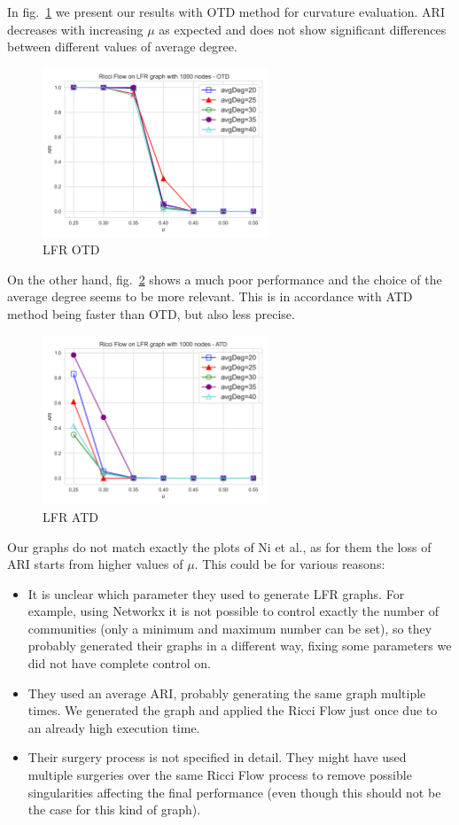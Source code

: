 In fig.~\ref{fig:LFR_OTD} we present our results with OTD method for curvature evaluation. ARI decreases with increasing $\mu$ as expected and does not show significant differences between different values of average degree.
\begin{figure}
    \centering
    \includegraphics[width=0.6\textwidth]{../tests/LFRResults/LFR_OTD.png}
    \caption{LFR OTD}
    \label{fig:LFR_OTD}
\end{figure}

On the other hand, fig.~\ref{fig:LFR_ATD} shows a much poor performance and the choice of the average degree seems to be more relevant. This is in accordance with ATD method being faster than OTD, but also less precise.
\begin{figure}
    \centering
    \includegraphics[width=0.6\textwidth]{../tests/LFRResults/LFR_ATD.png}
    \caption{LFR ATD}
    \label{fig:LFR_ATD}
\end{figure}

Our graphs do not match exactly the plots of Ni et al., as for them the loss of ARI starts from higher values of $\mu$. This could be for various reasons:
\begin{itemize}
    \item It is unclear which parameter they used to generate LFR graphs. For example, using Networkx it is not possible to control exactly the number of communities (only a minimum and maximum number can be set), so they probably generated their graphs in a different way, fixing some parameters we did not have complete control on.
    \item They used an average ARI, probably generating the same graph multiple times. We generated the graph and applied the Ricci Flow just once due to an already high execution time.
    \item Their surgery process is not specified in detail. They might have used multiple surgeries over the same Ricci Flow process to remove possible singularities affecting the final performance (even though this should not be the case for this kind of graph).
\end{itemize}